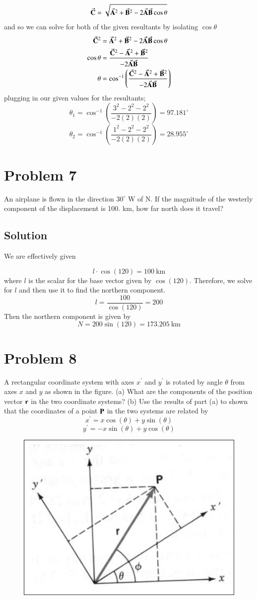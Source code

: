 \documentclass{article}
\begin{document}
\[
	\va C = \sqrt{\va A^2 + \va B^2 - 2\va A \va B \cos\theta}
\]
and so we can solve for both of the given resultants by isolating $\cos\theta$
\begin{align*}
	\va C^2 &=  \va A^2 + \va B^2 - 2\va A \va B \cos\theta \\
	\cos\theta &= \frac{\va C^2 - \va A^2 + \va B^2}{-2 \va A \va B} \\
	\theta &= \cos^{-1}\left( \frac{\va C^2 - \va A^2 + \va B^2}{-2 \va A \va B} \right)
\end{align*}
plugging in our given values for the resultants;
\[
	\theta_1 = \cos^{-1}\left( \frac{3^2 - 2^2 - 2^2}{-2 (2) (2)} \right) = 97.181^\circ
\]
\[
	\theta_2 = \cos^{-1}\left( \frac{1^2 - 2^2 - 2^2}{-2 (2) (2)} \right) = 28.955^\circ
\]

\section*{Problem 7}
An airplane is flown in the direction $30^\circ$ W of N. If the magnitude of the westerly component
of the displacement is 100. km, how far north does it travel?

\subsection*{Solution}
We are effectively given

\[
	l \cdot \cos(120) = 100\ \text{km}
\]
where $l$ is the scalar for the base vector given by $\cos (120)$. Therefore, we solve for $l$ and then use it to find the northern component.
\[
	l = \frac{100}{\cos(120)} = 200
\]
Then the northern component is given by
\[
	N = 200 \sin(120) = 173.205\ \text{km}
\]

\section*{Problem 8}
A rectangular coordinate system with axes $x^\prime$ and $y^\prime$ is rotated by angle $\theta$ from axes $x$ and $y$
as shown in the figure. (a) What are the components of the position vector $\vb r$ in the two
coordinate systems? (b) Use the results of part (a) to shown that the coordinates of a point $\vb P$ in
the two systems are related by
\[
	x^\prime = x\cos(\theta) + y\sin(\theta)
\]
\[
	y^\prime = -x\sin(\theta) + y\cos(\theta)
\]

\begin{figure}[ht]
    \centering
    \includegraphics[scale=0.5]{graph-3.png}
\end{figure}
\end{document}

